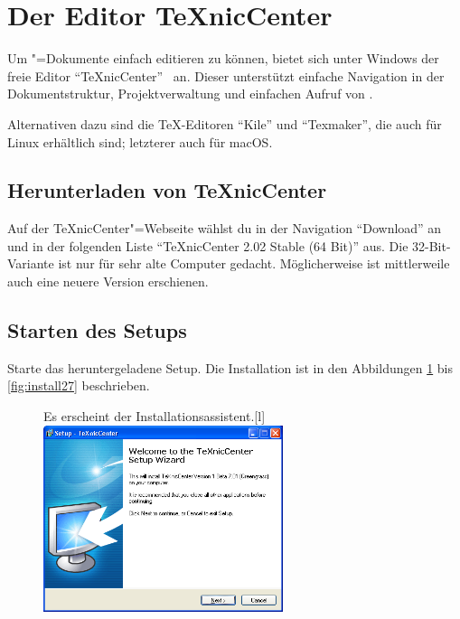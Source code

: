 
\clearpage %

\section{Der Editor TeXnicCenter}

Um \DMLLaTeX"=Dokumente einfach editieren zu können, bietet sich unter Windows der freie Editor \enquote{TeXnicCenter}~\cite{TeXnicCenter} an. Dieser unterstützt einfache Navigation in der Dokumentstruktur, Projektverwaltung und einfachen Aufruf von \DMLLaTeX.

Alternativen dazu sind die TeX-Editoren \enquote{Kile} und \enquote{Texmaker}, die auch für Linux erhältlich sind; letzterer auch für macOS.

\subsection{Herunterladen von TeXnicCenter}

Auf der TeXnicCenter"=Webseite
wählst du in der Navigation \enquote{Download} an und in der folgenden Liste \enquote{TeXnicCenter 2.02 Stable (64 Bit)} aus. Die 32-Bit-Variante ist nur für sehr alte Computer gedacht. Möglicherweise ist mittlerweile auch eine neuere Version erschienen.

\subsection{Starten des Setups}

Starte das heruntergeladene Setup. Die Installation ist in den Abbildungen \ref{fig:install20} bis \ref{fig:install27} beschrieben.

\begin{figure}[hb]
	\begin{captionbeside}{Es erscheint der Installationsassistent.}[l]
		\includegraphics[width=7cm]{images/TeXnicCenter-install-01.png}
	\end{captionbeside}
	\label{fig:install20}
\end{figure}

